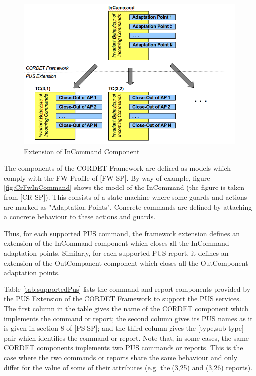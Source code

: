 \documentclass[a4paper,10pt]{article}
\begin{document}
\begin{figure}[H]
 \centering
 \includegraphics[scale=0.415,keepaspectratio=true]{InCmdAdaptation.png}
 \caption{Extension of InCommand Component}
 \label{fig:InCmdAdaptation}
\end{figure}

The components of the CORDET Framework are defined as models which comply with the FW Profile of [FW-SP]. By way of example, figure \ref{fig:CrFwInCommand} shows the model of the InCommand (the figure is taken from [CR-SP]). This consists of a state machine where some guards and actions are marked as "Adaptation Points". Concrete commands are defined by attaching a concrete behaviour to these actions and guards.

Thus, for each supported PUS command, the framework extension defines an extension of the InCommand component which closes all the InCommand adaptation points. Similarly, for each supported PUS report, it defines an extension of the OutComponent component which closes all the OutComponent adaptation points.

Table \ref{tab:supportedPus} lists the command and report components provided by the PUS Extension of the CORDET Framework to support the PUS services. The first column in the table gives the name of the CORDET component which implements the command or report; the second column gives its PUS names as it is given in section 8 of [PS-SP]; and the third column gives the [type,sub-type] pair which identifies the command or report. Note that, in some cases, the same CORDET components implements two PUS commands or reports. This is the case where the two commands or reports share the same behaviour and only differ for the value of some of their attributes (e.g. the (3,25) and (3,26) reports).
\end{document}
